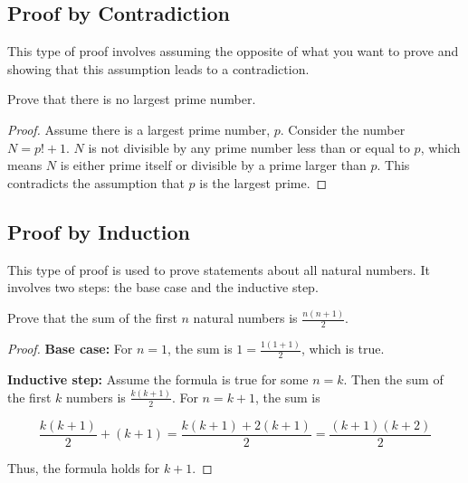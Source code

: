 \documentclass{article}
\theoremstyle{mytheoremstyle}
\theoremstyle{mytheoremstyle}
\theoremstyle{myexamplestyle}
\begin{document}
\subsection{Proof by Contradiction}

This type of proof involves assuming the opposite of what you want to prove and showing that this assumption leads to a contradiction.


\begin{example}
    Prove that there is no largest prime number.
    \begin{proof}
        Assume there is a largest prime number, \( p \). Consider
        the number \( N = p! + 1 \). \( N \) is not divisible by any
        prime number less than or equal to \( p \), which means
        \( N \) is either prime itself or divisible by a prime
        larger than \( p \). This contradicts the assumption that
        \( p \) is the largest prime.
    \end{proof}
\end{example}

\subsection{Proof by Induction}

This type of proof is used to prove statements about all natural numbers. It involves two steps: the base case and the inductive step.

\begin{example}
    Prove that the sum of the first \( n \) natural numbers is
    \( \displaystyle\frac{n(n+1)}{2} \).

    \begin{proof}

        \textbf{Base case:} For \( n = 1 \), the sum is
        \(\displaystyle 1 = \frac{1(1+1)}{2} \), which is true.

        \textbf{Inductive step:} Assume the formula is true for some \( n = k \). Then the sum of the first \( k \) numbers is \(\displaystyle \frac{k(k+1)}{2} \). For \( n = k+1 \), the sum is

        \[\frac{k(k+1)}{2} + (k+1) = \frac{k(k+1) + 2(k+1)}{2} = \frac{(k+1)(k+2)}{2}\]

        Thus, the formula holds for \( k+1 \).
    \end{proof}
\end{example}
\end{document}
